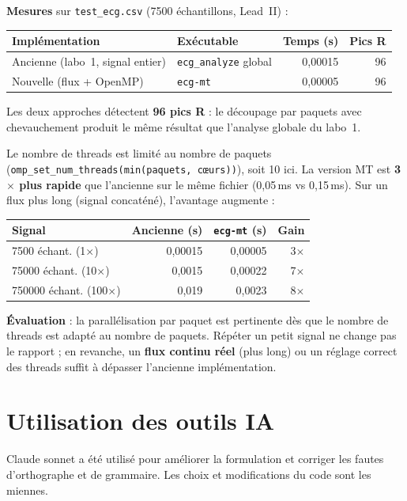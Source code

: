 \documentclass[a4paper,12pt]{article}
\begin{document}
\textbf{Mesures} sur \texttt{test\_ecg.csv} (7500 échantillons, Lead~II) :

\begin{center}
\begin{tabular}{|l|l|r|r|}
\hline
Implémentation & Exécutable & Temps (s) & Pics R \\
\hline
Ancienne (labo~1, signal entier) & \texttt{ecg\_analyze} global & 0{,}00015 & 96 \\
Nouvelle (flux + OpenMP) & \texttt{ecg-mt} & 0{,}00005 & 96 \\
\hline
\end{tabular}
\end{center}

Les deux approches détectent \textbf{96 pics R} : le découpage par paquets avec chevauchement produit le même résultat que l'analyse globale du labo~1.

Le nombre de threads est limité au nombre de paquets (\texttt{omp\_set\_num\_threads(min(paquets, cœurs))}), soit 10 ici. La version MT est \textbf{3$\times$ plus rapide} que l'ancienne sur le même fichier (0{,}05\,ms vs 0{,}15\,ms). Sur un flux plus long (signal concaténé), l'avantage augmente :

\begin{center}
\begin{tabular}{|l|r|r|r|}
\hline
Signal & Ancienne (s) & \texttt{ecg-mt} (s) & Gain \\
\hline
7500 échant. (1$\times$) & 0{,}00015 & 0{,}00005 & 3$\times$ \\
75000 échant. (10$\times$) & 0{,}0015 & 0{,}00022 & 7$\times$ \\
750000 échant. (100$\times$) & 0{,}019 & 0{,}0023 & 8$\times$ \\
\hline
\end{tabular}
\end{center}

\textbf{Évaluation} : la parallélisation par paquet est pertinente dès que le nombre de threads est adapté au nombre de paquets. Répéter un petit signal ne change pas le rapport ; en revanche, un \textbf{flux continu réel} (plus long) ou un réglage correct des threads suffit à dépasser l'ancienne implémentation.

\newpage

\section*{Utilisation des outils IA}

Claude sonnet a été utilisé pour améliorer la formulation et corriger les fautes d'orthographe et de grammaire. Les choix et modifications du code sont les miennes.
\end{document}
